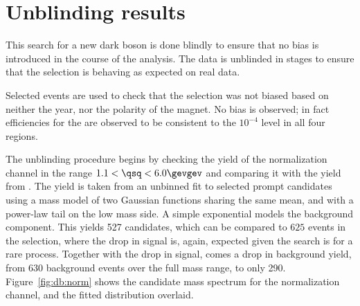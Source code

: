 \section{Unblinding results}

This search for a new dark boson is done blindly to ensure that no bias is introduced in the
course of the analysis.
The data is unblinded in stages to ensure that the selection is behaving as expected on real data.


Selected \decay{\Bd}{\jpsi\Kstarz} events are used to check that the selection was not biased
based on neither the year, nor the polarity of the \lhcb magnet.
No bias is observed; in fact
efficiencies for the \uBDT are observed to be consistent to the $10^{-4}$ level in all four regions.

The unblinding procedure begins by checking the yield of the normalization channel
\btokstrmumu in the range $1.1<\qsq<6.0\gevgev$ and comparing it with the yield from
.
The yield is taken from an unbinned fit to selected prompt \btokstrdb candidates using a mass model
of two Gaussian functions sharing the same mean, and with a power-law tail on the low mass side.
A simple exponential models the background component.
This yields 527 \Bd candidates, which can be compared to \approx$625$ events in the \sm selection,
where the drop in signal is, again, expected given the search is for a rare process.
Together with the drop in signal, comes a drop in background yield, from \approx$630$ background
events over the full mass range, to only 290.
Figure~\ref{fig:db:norm} shows the \Bd candidate mass spectrum for the normalization channel, and
the fitted distribution overlaid.

